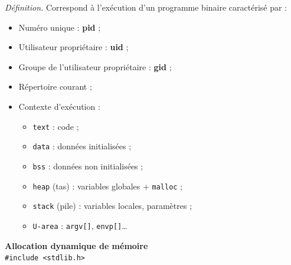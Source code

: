 \documentclass[french]{scrartcl}
\begin{document}
\begin{multicols}{3}
\clearpage
\vskip 10pt
\emph{Définition.} Correspond à l'exécution d'un programme binaire caractérisé par :\begin{itemize}
	\item Numéro unique : \textbf{pid} ;
	\item Utilisateur propriétaire : \textbf{uid} ;
	\item Groupe de l'utilisateur propriétaire : \textbf{gid} ;
	\item Répertoire courant ;
	\item Contexte d'exécution :\begin{itemize}
		\item \lstinline!text! : code ;
		\item \lstinline!data! : données initialisées ;
		\item \lstinline!bss! : données non initialisées ;
		\item \lstinline!heap! (tas) : variables globales + \lstinline!malloc! ;
		\item \lstinline!stack! (pile) : variables locales, paramètres ;
		\item \lstinline!U-area! : \lstinline!argv[]!, \lstinline!envp[]!\dots
	\end{itemize}
\end{itemize}

\vskip 5pt
\textbf{Allocation dynamique de mémoire}\\
\lstinline!#include <stdlib.h>!\\


\end{multicols}
\end{document}
